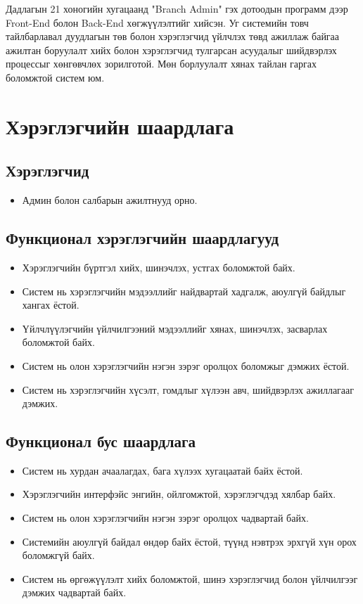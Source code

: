 Дадлагын 21 хоногийн хугацаанд "Branch Admin" гэх дотоодын программ дээр Front-End болон Back-End хөгжүүлэлтийг хийсэн. Уг системийн товч тайлбарлавал дуудлагын төв болон хэрэглэгчид үйлчлэх төвд ажиллаж байгаа ажилтан боруулалт хийх болон хэрэглэгчид тулгарсан асуудалыг шийдвэрлэх процессыг хөнгөвчлөх зорилготой. Мөн борлуулалт хянах тайлан гаргах боломжтой систем юм.
\section{Хэрэглэгчийн шаардлага}

  \subsection{Хэрэглэгчид}
    \begin{itemize}
        \item Админ болон салбарын ажилтнууд орно.
    \end{itemize}

  \subsection{Функционал хэрэглэгчийн шаардлагууд}
    \begin{itemize}
        \item Хэрэглэгчийн бүртгэл хийх, шинэчлэх, устгах боломжтой байх.
        \item Систем нь хэрэглэгчийн мэдээллийг найдвартай хадгалж, аюулгүй байдлыг хангах ёстой.
        \item Үйлчлүүлэгчийн үйлчилгээний мэдээллийг хянах, шинэчлэх, засварлах боломжтой байх.
        \item Систем нь олон хэрэглэгчийн нэгэн зэрэг оролцох боломжыг дэмжих ёстой.
        \item Систем нь хэрэглэгчийн хүсэлт, гомдлыг хүлээн авч, шийдвэрлэх ажиллагааг дэмжих.
    \end{itemize}

  \subsection{Функционал бус шаардлага}
    \begin{itemize}
        \item Систем нь хурдан ачаалагдах, бага хүлээх хугацаатай байх ёстой.
        \item Хэрэглэгчийн интерфэйс энгийн, ойлгомжтой, хэрэглэгчдэд хялбар байх.
        \item Систем нь олон хэрэглэгчийн нэгэн зэрэг оролцох чадвартай байх.
        \item Системийн аюулгүй байдал өндөр байх ёстой, түүнд нэвтрэх эрхгүй хүн орох боломжгүй байх.
        \item Систем нь өргөжүүлэлт хийх боломжтой, шинэ хэрэглэгчид болон үйлчилгээг дэмжих чадвартай байх.
    \end{itemize}

